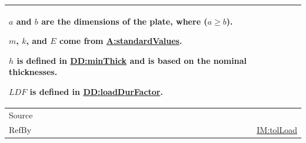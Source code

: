 \documentclass[12pt]{article}
\begin{document}
\begin{minipage}{\textwidth}
\begin{tabular}{>{\raggedright}p{}>{\raggedright\arraybackslash}p{}}
        $a$ and $b$ are the dimensions of the plate, where ($a\geq{}b$).
        
        $m$, $k$, and $E$ come from \hyperref[assumpSV]{A:standardValues}.
        
        $h$ is defined in \hyperref[DD:minThick]{DD:minThick} and is based on the nominal thicknesses.
        
        $\mathit{LDF}$ is defined in \hyperref[DD:loadDurFactor]{DD:loadDurFactor}.
        
\\ \midrule
Source & \cite{astm2009}
         
\\ \midrule
RefBy & \hyperref[IM:tolLoad]{IM:tolLoad}
        
\\ \bottomrule
\end{tabular}
\end{minipage}
\end{document}
